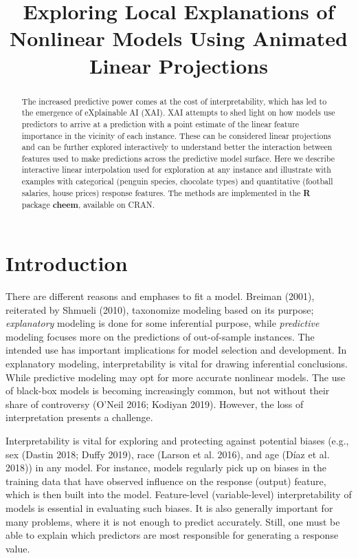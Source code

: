 \documentclass[
]{article}
\title{Exploring Local Explanations of Nonlinear Models Using Animated Linear Projections}
\author{}
\date{\vspace{-2.5em}}
\begin{document}
\maketitle
\begin{abstract}
The increased predictive power comes at the cost of interpretability, which has led to the emergence of eXplainable AI (XAI). XAI attempts to shed light on how models use predictors to arrive at a prediction with a point estimate of the linear feature importance in the vicinity of each instance. These can be considered linear projections and can be further explored interactively to understand better the interaction between features used to make predictions across the predictive model surface. Here we describe interactive linear interpolation used for exploration at any instance and illustrate with examples with categorical (penguin species, chocolate types) and quantitative (football salaries, house prices) response features. The methods are implemented in the \textbf{R} package \textbf{cheem}, available on CRAN.
\end{abstract}

\hypertarget{sec:intro}{%
\section{Introduction}\label{sec:intro}}

There are different reasons and emphases to fit a model. Breiman (2001), reiterated by Shmueli (2010), taxonomize modeling based on its purpose; \emph{explanatory} modeling is done for some inferential purpose, while \emph{predictive} modeling focuses more on the predictions of out-of-sample instances. The intended use has important implications for model selection and development. In explanatory modeling, interpretability is vital for drawing inferential conclusions. While predictive modeling may opt for more accurate nonlinear models. The use of black-box models is becoming increasingly common, but not without their share of controversy (O'Neil 2016; Kodiyan 2019). However, the loss of interpretation presents a challenge.

Interpretability is vital for exploring and protecting against potential biases (e.g., sex (Dastin 2018; Duffy 2019), race (Larson et al. 2016), and age (Díaz et al. 2018)) in any model. For instance, models regularly pick up on biases in the training data that have observed influence on the response (output) feature, which is then built into the model. Feature-level (variable-level) interpretability of models is essential in evaluating such biases. It is also generally important for many problems, where it is not enough to predict accurately. Still, one must be able to explain which predictors are most responsible for generating a response value.
\end{document}
